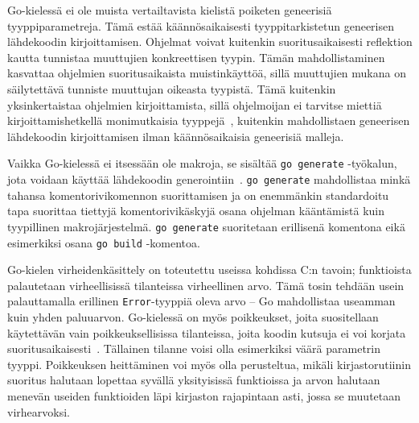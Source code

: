 Go-kielessä ei ole muista vertailtavista kielistä poiketen geneerisiä
tyyppiparametreja. Tämä estää käännösaikaisesti tyyppitarkistetun geneerisen
lähdekoodin kirjoittamisen. Ohjelmat voivat kuitenkin suoritusaikaisesti
reflektion kautta tunnistaa muuttujien konkreettisen tyypin. Tämän
mahdollistaminen kasvattaa ohjelmien suoritusaikaista muistinkäyttöä, sillä
muuttujien mukana on säilytettävä tunniste muuttujan oikeasta tyypistä. Tämä
kuitenkin yksinkertaistaa ohjelmien kirjoittamista, sillä ohjelmoijan ei
tarvitse miettiä kirjoittamishetkellä monimutkaisia
tyyppejä~\citep[esim.][kalvo 8]{gohistory}, kuitenkin mahdollistaen geneerisen
lähdekoodin kirjoittamisen ilman käännösaikaisia geneerisiä malleja.


Vaikka Go-kielessä ei itsessään ole makroja, se sisältää \texttt{go~generate}
-työkalun, jota voidaan käyttää lähdekoodin generointiin~\citep{gogenerate}.
\texttt{go~generate} mahdollistaa minkä tahansa komentorivikomennon suorittamisen
ja on enemmänkin standardoitu tapa suorittaa tiettyjä komentorivikäskyjä osana
ohjelman kääntämistä kuin tyypillinen makrojärjestelmä.
\texttt{\mbox{go~generate}} suoritetaan erillisenä komentona eikä esimerkiksi osana
\texttt{\mbox{go~build}} -komentoa.



Go-kielen virheidenkäsittely on toteutettu useissa kohdissa C:n tavoin;
funktioista palautetaan virheellisissä tilanteissa virheellinen arvo. Tämä
tosin tehdään usein palauttamalla erillinen \texttt{Error}-tyyppiä oleva arvo
-- Go mahdollistaa useamman kuin yhden paluuarvon. Go-kielessä on myös
poikkeukset, joita suositellaan käytettävän vain poikkeuksellisissa
tilanteissa, joita koodin kutsuja ei voi korjata
suoritusaikaisesti~\citep{effectivego}. Tällainen tilanne voisi olla esimerkiksi
väärä parametrin tyyppi. Poikkeuksen heittäminen voi myös olla perusteltua,
mikäli kirjastorutiinin suoritus halutaan lopettaa syvällä yksityisissä
funktioissa ja arvon halutaan menevän useiden funktioiden läpi kirjaston
rajapintaan asti, jossa se muutetaan virhearvoksi.

